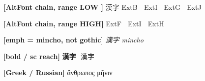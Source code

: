 \documentclass{article}
\begin{document}
\large
\textbf{[AltFont chain, range LOW ]} 漢字  ExtB 𠀀  ExtI 𮯰  ExtG 𰀀  ExtJ 𲎰\par\smallskip
\textbf{[AltFont chain, range HIGH]} ExtF 𮯠  ExtI 𮹝  ExtH 𲎯\par\smallskip
\textbf{[emph = mincho, not gothic]} \emph{漢字 mincho 𠀀}\par\smallskip
\textbf{[bold / sc reach]} \textbf{漢字 𠀀}\quad\textsc{漢字 𠀀}\par\smallskip
\textbf{[Greek / Russian]} {\greekfont ἄνθρωπος μῆνιν}\par
\end{document}
